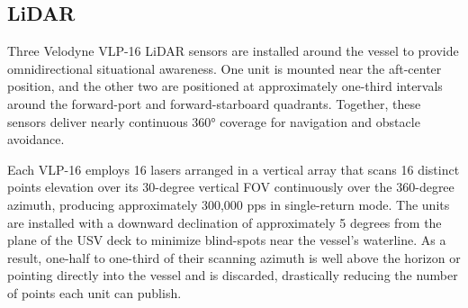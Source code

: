 \documentclass[../main.tex]{subfiles}
\begin{document}


\subsection{LiDAR} \label{sensors_LiDAR}


Three Velodyne VLP-16 \ac{LiDAR} sensors are installed around the vessel to provide omnidirectional situational awareness. 
One unit is mounted near the aft-center position, and the other two are positioned at approximately one-third intervals around the forward-port and forward-starboard quadrants. 
Together, these sensors deliver nearly continuous 360° coverage for navigation and obstacle avoidance.

Each VLP-16 employs 16 lasers arranged in a vertical array that scans 16 distinct points elevation over its 30-degree vertical \ac{FOV} continuously over the 360-degree azimuth, producing approximately 300,000 \ac{pps} in single-return mode. 
The units are installed with a downward declination of approximately 5 degrees from the plane of the \ac{USV} deck to minimize blind-spots near the vessel's waterline.
As a result, one-half to one-third of their scanning azimuth is well above the horizon or pointing directly into the vessel and is discarded, drastically reducing the number of points each unit can publish.
\end{document}
